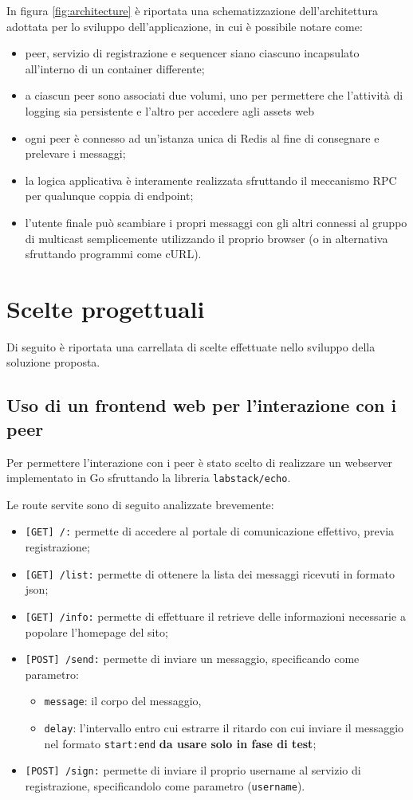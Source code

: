 \documentclass[conference]{IEEEtran}
\begin{document}
In figura \ref{fig:architecture} è riportata una schematizzazione dell'architettura adottata per lo sviluppo dell'applicazione, in cui è possibile notare come:
\begin{itemize}
\item peer, servizio di registrazione e sequencer siano ciascuno incapsulato all'interno di un container differente;
\item a ciascun peer sono associati due volumi, uno per permettere che l'attività di logging sia persistente e l'altro per accedere agli assets web

\item ogni peer è connesso ad un'istanza unica di Redis al fine di consegnare e prelevare i messaggi;

\item la logica applicativa è interamente realizzata sfruttando il meccanismo RPC per qualunque coppia di endpoint;

\item l'utente finale può scambiare i propri messaggi con gli altri connessi al gruppo di multicast semplicemente utilizzando il proprio browser (o in alternativa sfruttando programmi come cURL). 
\end{itemize}
\section{Scelte progettuali}
Di seguito è riportata una carrellata di scelte effettuate nello sviluppo della soluzione proposta.

\subsection{Uso di un frontend web per l'interazione con i peer}
Per permettere l'interazione con i peer è stato scelto di realizzare un webserver implementato in Go sfruttando la libreria \texttt{labstack/echo}.

Le route servite sono di seguito analizzate brevemente:
\begin{itemize}
\item \texttt{[GET] /:} permette di accedere al portale di comunicazione effettivo, previa registrazione;
\item \texttt{[GET] /list:} permette di ottenere la lista dei messaggi ricevuti in formato json;
\item \texttt{[GET] /info:} permette di effettuare il retrieve delle informazioni necessarie a popolare l'homepage del sito;
\item \texttt{[POST] /send:} permette di inviare un messaggio, specificando come parametro:
\begin{itemize}
\item \texttt{message}: il corpo del messaggio,
\item \texttt{delay}: l'intervallo entro cui estrarre il ritardo con cui inviare il messaggio nel formato \texttt{start:end} \textbf{da usare solo in fase di test};
\end{itemize}
\item \texttt{[POST] /sign:} permette di inviare il proprio username al servizio di registrazione, specificandolo come parametro (\texttt{username}).
\end{itemize}
\end{document}
